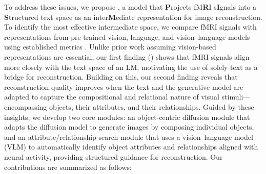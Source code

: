 To address these issues, we propose \prism, a model that {\textbf{P}}rojects fM{\textbf{R}}I s{\textbf{I}}gnals into a \textbf{S}tructured text space as an inter{\textbf{M}}ediate representation for image reconstruction. To identify the most effective intermediate space, we compare fMRI signals with representations from pre-trained vision, language, and vision–language models using established metrics \citep{wang2020finding, murphy2024correcting, keskar2016large}. Unlike prior work assuming vision-based representations are essential, our first finding () shows that fMRI signals align more closely with the text space of an LM, motivating the use of solely text as a bridge for reconstruction. Building on this, our second finding reveals that reconstruction quality improves when the text and the generative model are adapted to capture the compositional and relational nature of visual stimuli—encompassing objects, their attributes, and their relationships. Guided by these insights, we develop two core modules: an object-centric diffusion module that adapts the diffusion model to generate images by composing individual objects, and an attribute/relationship search module that uses a vision–language model (VLM) to automatically identify object attributes and relationships aligned with neural activity, providing structured guidance for reconstruction.
Our contributions are summarized as follows:
